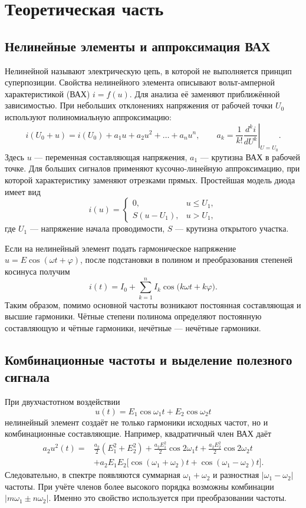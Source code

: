 \section{Теоретическая часть}

\subsection{Нелинейные элементы и аппроксимация ВАХ}

Нелинейной называют электрическую цепь, в которой не выполняется принцип суперпозиции. Свойства нелинейного элемента описывают вольт-амперной характеристикой (ВАХ) $i=f(u)$. Для анализа её заменяют приближённой зависимостью. При небольших отклонениях напряжения от рабочей точки $U_0$ используют полиномиальную аппроксимацию:
\[
i(U_0+u)=i(U_0)+a_1u+a_2u^2+\ldots+a_nu^n,
\qquad a_k=\frac{1}{k!}\left.\frac{d^ki}{dU^k}\right|_{U=U_0}.
\]
Здесь $u$ --- переменная составляющая напряжения, $a_1$ --- крутизна ВАХ в рабочей точке. Для больших сигналов применяют кусочно-линейную аппроксимацию, при которой характеристику заменяют отрезками прямых. Простейшая модель диода имеет вид
\[
i(u)=\begin{cases}0,&u\leq U_1,\\S(u-U_1),&u>U_1,\end{cases}
\]
где $U_1$ --- напряжение начала проводимости, $S$ --- крутизна открытого участка.

Если на нелинейный элемент подать гармоническое напряжение $u=E\cos(\omega t+\varphi)$, после подстановки в полином и преобразования степеней косинуса получим
\[
i(t)=I_0+\sum_{k=1}^{n}I_k\cos\bigl(k\omega t+k\varphi\bigr).
\]
Таким образом, помимо основной частоты возникают постоянная составляющая и высшие гармоники. Чётные степени полинома определяют постоянную составляющую и чётные гармоники, нечётные --- нечётные гармоники.

\subsection{Комбинационные частоты и выделение полезного сигнала}

При двухчастотном воздействии
\[
u(t)=E_1\cos\omega_1t+E_2\cos\omega_2t
\]
нелинейный элемент создаёт не только гармоники исходных частот, но и комбинационные составляющие. Например, квадратичный член ВАХ даёт
\begin{align*}
a_2u^2(t)={}&\frac{a_2}{2}(E_1^2+E_2^2)
+\frac{a_2E_1^2}{2}\cos2\omega_1t
+\frac{a_2E_2^2}{2}\cos2\omega_2t\\
&+a_2E_1E_2\bigl[\cos(\omega_1+\omega_2)t+\cos(\omega_1-\omega_2)t\bigr].
\end{align*}
Следовательно, в спектре появляются суммарная $\omega_1+\omega_2$ и разностная $|\omega_1-\omega_2|$ частоты. При учёте членов более высокого порядка возможны комбинации $|m\omega_1\pm n\omega_2|$. Именно это свойство используется при преобразовании частоты.

